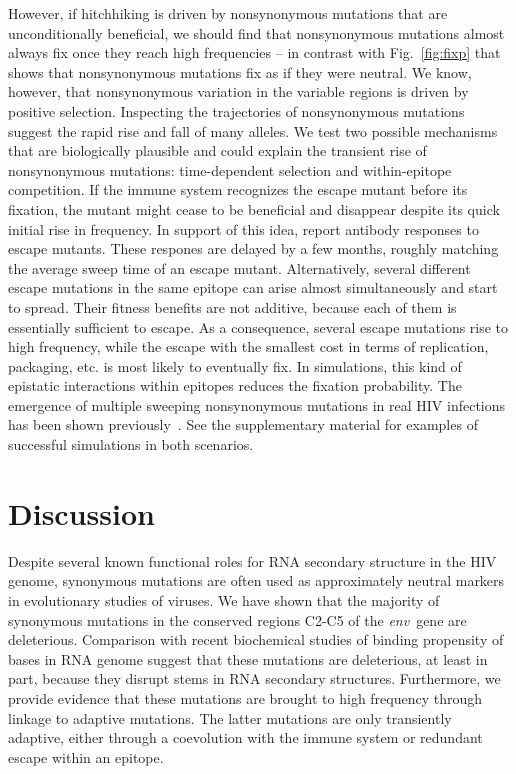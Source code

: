 \documentclass[rmp, twocolumn]{revtex4}
\newcommand{\FIG}[1]{Fig.~\ref{fig:#1}}
\newcommand{\env}{\textit{env}}
\begin{document}
However, if hitchhiking is driven by nonsynonymous mutations that are
unconditionally beneficial, we should find that nonsynonymous mutations almost
always fix once they reach high frequencies -- in contrast with \FIG{fixp} that
shows that nonsynonymous mutations fix as if they were neutral. We know,
however, that nonsynonymous variation in the variable regions is driven by
positive selection. Inspecting the trajectories of nonsynonymous mutations
suggest the rapid rise and fall of many alleles.  We test two possible
mechanisms that are biologically plausible and could explain the transient rise
of nonsynonymous mutations: time-dependent selection and within-epitope
competition. If the immune system recognizes the escape mutant before its
fixation, the mutant might cease to be beneficial and disappear despite its
quick initial rise in frequency.  In support of this idea,
\citet{richman_rapid_2003, bunnik_autologous_2008} report antibody responses to
escape mutants. These respones are delayed by a few months, roughly matching the
average sweep time of an escape mutant. Alternatively, several different escape
mutations in the same epitope can arise almost simultaneously and start to
spread. Their fitness benefits are not additive, because each of them is
essentially sufficient to escape. As a consequence, several escape mutations rise to
high frequency, while the escape with the smallest cost in terms of replication,
packaging, etc. is most likely to
eventually fix. In simulations, this kind of epistatic interactions within
epitopes reduces the fixation probability. The emergence of
multiple sweeping nonsynonymous mutations in real HIV infections has been shown
previously~\citep{moore_limited_2009, bar_early_2012}.
See the supplementary material for examples of successful simulations in both scenarios.

\section{Discussion}
Despite several known functional roles for RNA secondary structure in the HIV
genome, synonymous mutations are often used as approximately neutral markers in
evolutionary studies of viruses. We have shown that the majority of synonymous
mutations in the conserved regions C2-C5 of the \env~gene are deleterious.
Comparison with recent biochemical studies of binding propensity of bases in RNA
genome suggest that these mutations are deleterious, at least in part, because they disrupt
stems in RNA secondary structures. Furthermore, we provide evidence that these
mutations are brought to high frequency through linkage to adaptive mutations.
The latter mutations are only transiently adaptive, either through a
coevolution with the immune system or redundant escape within an epitope. 
\end{document}
